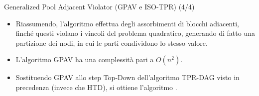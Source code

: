 \documentclass[9pt]{beamer}
\begin{document}
\begin{tframe}{Generalized Pool Adjacent Violator (GPAV e ISO-TPR) (4/4)}
\begin{center}
\end{center}
\begin{itemize}
\item Riassumendo, l’algoritmo effettua degli assorbimenti di blocchi adiacenti, finché questi violano i vincoli del problema quadratico, generando di fatto una partizione dei nodi, in cui le parti condividono lo stesso valore.
\item L'algoritmo GPAV ha una complessità pari a $O(n^2)$.
\item Sostituendo GPAV allo step Top-Down dell'algoritmo TPR-DAG visto in precedenza (invece che HTD), si ottiene l'algoritmo .
\end{itemize}
\end{tframe}
\end{document}
